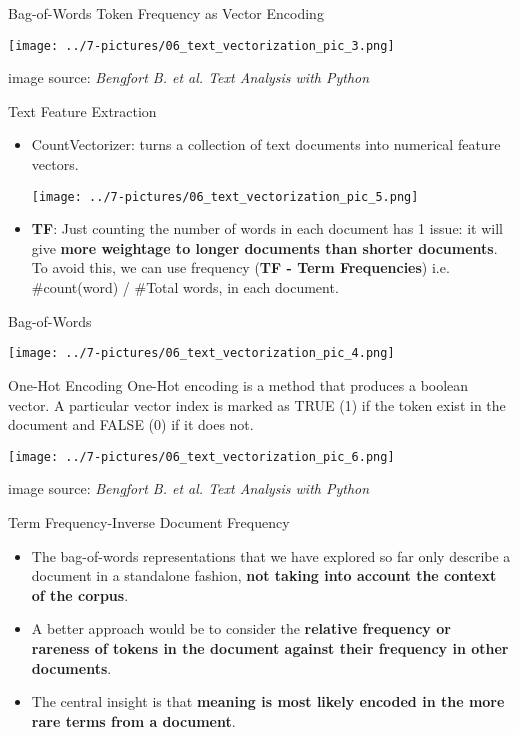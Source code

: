 \documentclass[11pt]{beamer}
\begin{document}
\begin{frame}{Bag-of-Words}
	Token Frequency as Vector Encoding
	\begin{center}
	\texttt{[image: ../7-pictures/06\_text\_vectorization\_pic\_3.png]}
	\end{center}
	\footnotesize{image source: \textit{Bengfort B. et al. Text Analysis with Python}}
\end{frame}
\begin{frame}{Text Feature Extraction}
	\begin{itemize}
		\item CountVectorizer: turns a collection of text documents into numerical feature vectors.
	\begin{center}
	\texttt{[image: ../7-pictures/06\_text\_vectorization\_pic\_5.png]}
	\end{center}
		\item \textbf{TF}: Just counting the number of words in each document has 1 issue: it will give \textbf{more weightage to longer documents than shorter documents}. To avoid this, we can use frequency (\textbf{TF - Term Frequencies}) i.e. \#count(word) / \#Total words, in each document.
	\end{itemize}
\end{frame}
\begin{frame}{Bag-of-Words  }
	\begin{center}
	\texttt{[image: ../7-pictures/06\_text\_vectorization\_pic\_4.png]}
	\end{center}
\end{frame}
\begin{frame}{One-Hot Encoding}
	One-Hot encoding is a method that produces a boolean vector. A particular vector index is marked as TRUE (1) if the token exist in the document and FALSE (0) if it does not.
	\begin{center}
	\texttt{[image: ../7-pictures/06\_text\_vectorization\_pic\_6.png]}
	\end{center}
	\footnotesize{image source: \textit{Bengfort B. et al. Text Analysis with Python}}
\end{frame}
\begin{frame}{Term Frequency-Inverse Document Frequency }
	\begin{itemize}
		\item The bag-of-words representations that we have explored so far only describe a document in a standalone fashion, \textbf{not taking into account the context of the corpus}. 
		\item A better approach would be to consider the \textbf{relative frequency or rareness of tokens in the document against their frequency in other documents}. 
		\item The central insight is that \textbf{meaning is most likely encoded in the more rare terms from a document}.
	\end{itemize}
\end{frame}
\end{document}

